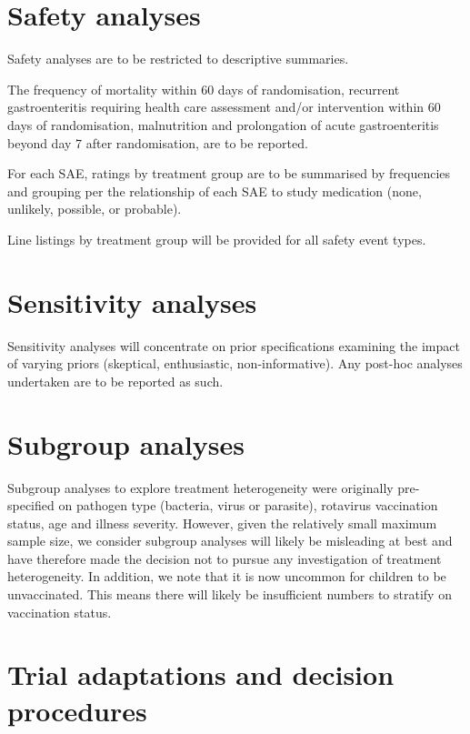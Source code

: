 \documentclass[a4paper]{article}
\begin{document}
\section{Safety analyses}

Safety analyses are to be restricted to descriptive summaries.

The frequency of mortality within 60 days of randomisation, recurrent gastroenteritis requiring health care assessment and/or intervention within 60 days of randomisation, malnutrition and prolongation of acute gastroenteritis beyond day 7 after randomisation, are to be reported. 

For each SAE, ratings by treatment group are to be summarised by frequencies and grouping per the relationship of each SAE to study medication (none, unlikely, possible, or probable).

Line listings by treatment group will be provided for all safety event types.

\section{Sensitivity analyses}

Sensitivity analyses will concentrate on prior specifications examining the impact of varying priors (skeptical, enthusiastic, non-informative).
Any post-hoc analyses undertaken are to be reported as such.

\section{Subgroup analyses}

Subgroup analyses to explore treatment heterogeneity were originally pre-specified on pathogen type (bacteria, virus or parasite), rotavirus vaccination status, age and illness severity.
However, given the relatively small maximum sample size, we consider subgroup analyses will likely be misleading at best and have therefore made the decision not to pursue any investigation of treatment heterogeneity.
In addition, we note that it is now uncommon for children to be unvaccinated.
This means there will likely be insufficient numbers to stratify on vaccination status.

\section{Trial adaptations and decision procedures}\label{trial-adaptations-and-decision-procedures}
\end{document}
